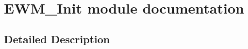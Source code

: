 \hypertarget{group___e_w_m___init__module}{}\section{E\+W\+M\+\_\+\+Init module documentation}
\label{group___e_w_m___init__module}


\subsection{Detailed Description}
